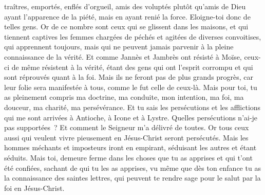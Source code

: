 \begin{multicols}{2}
traîtres, emportés, enflés d'orgueil, amis des voluptés plutôt qu'amis de Dieu
ayant l'apparence de la piété, mais en ayant renié la force. Eloigne-toi donc de telles gens.
Or de ce nombre sont ceux qui se glissent dans les maisons, et qui tiennent captives les femmes chargées de péchés et agitées de diverses convoitises,
qui apprennent toujours, mais qui ne peuvent jamais parvenir à la pleine connaissance de la vérité.
Et comme Jannès et Jambrès ont résisté à Moïse, ceux-ci de même résistent à la vérité, étant des gens qui ont l'esprit corrompu et qui sont réprouvés quant à la foi.
Mais ils ne feront pas de plus grands progrès, car leur folie sera manifestée à tous, comme le fut celle de ceux-là.
Mais pour toi, tu as pleinement compris ma doctrine, ma conduite, mon intention, ma foi, ma douceur, ma charité, ma persévérance.
Et tu sais les persécutions et les afflictions qui me sont arrivées à Antioche, à Icone et à Lystre. Quelles persécutions n'ai-je pas supportées~? Et comment le Seigneur m'a délivré de toutes.
Or tous ceux aussi qui veulent vivre pieusement en Jésus-Christ seront persécutés.
Mais les hommes méchants et imposteurs iront en empirant, séduisant les autres et étant séduits.
Mais toi, demeure ferme dans les choses que tu as apprises et qui t'ont été confiées, sachant de qui tu les as apprises,
vu même que dès ton enfance tu as la connaissance des saintes lettres, qui peuvent te rendre sage pour le salut par la foi en Jésus-Christ.

\end{multicols}
